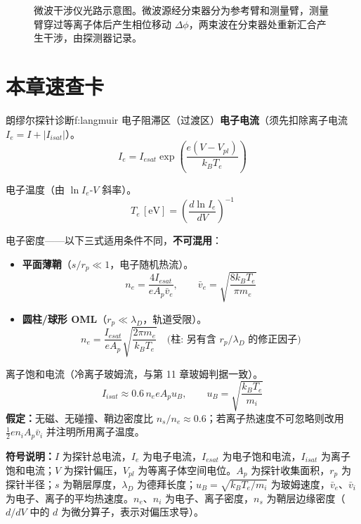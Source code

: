 \begin{figure}[htbp]
    \caption{微波干涉仪光路示意图。微波源经分束器分为参考臂和测量臂，测量臂穿过等离子体后产生相位移动 $\Delta\phi$，两束波在分束器处重新汇合产生干涉，由探测器记录。}
    \label{fig:interferometer}
\end{figure}


\section{本章速查卡}

\begin{formulabox}{朗缪尔探针诊断}{f:langmuir}
电子阻滞区（过渡区）\textbf{电子电流}（须先扣除离子电流 $I_e = I + |I_{isat}|$）。
\[
    I_e = I_{esat} \exp\left(\frac{e(V - V_{pl})}{k_B T_e}\right)
\]

电子温度（由 $\ln I_e$-$V$ 斜率）。
\[
    T_e\,[\mathrm{eV}] = \left(\frac{d\ln I_e}{dV}\right)^{-1}
\]

电子密度——以下三式适用条件不同，\textbf{不可混用}：
\begin{itemize}
    \item \textbf{平面薄鞘}（$s/r_p\ll1$，电子随机热流）。
    \[
        n_e = \frac{4 I_{esat}}{e A_p \bar v_e},\qquad \bar v_e = \sqrt{\frac{8k_BT_e}{\pi m_e}}
    \]
    \item \textbf{圆柱/球形 OML}（$r_p\ll\lambda_D$，轨道受限）。
    \[
        n_e = \frac{I_{esat}}{e A_p}\sqrt{\frac{2\pi m_e}{k_B T_e}}
        \quad\text{(柱: 另有含 } r_p/\lambda_D \text{ 的修正因子)}
    \]
\end{itemize}

离子饱和电流（冷离子玻姆流，与第 11 章玻姆判据一致）。
\[
    I_{isat} \approx 0.6\, n_e e A_p u_B,\qquad u_B = \sqrt{\frac{k_B T_e}{m_i}}
\]
\textbf{假定：}无磁、无碰撞、鞘边密度比 $n_s/n_e \approx 0.6$；若离子热速度不可忽略则改用 $\frac12 en_iA_p\bar v_i$ 并注明所用离子温度。

\textbf{符号说明：}$I$ 为探针总电流，$I_e$ 为电子电流，$I_{esat}$ 为电子饱和电流，$I_{isat}$ 为离子饱和电流；$V$ 为探针偏压，$V_{pl}$ 为等离子体空间电位。$A_p$ 为探针收集面积，$r_p$ 为探针半径；$s$ 为鞘层厚度，$\lambda_D$ 为德拜长度；$u_B=\sqrt{k_BT_e/m_i}$ 为玻姆速度，$\bar v_e$、$\bar v_i$ 为电子、离子的平均热速度。$n_e$、$n_i$ 为电子、离子密度，$n_s$ 为鞘层边缘密度（$d/dV$ 中的 $d$ 为微分算子，表示对偏压求导）。
\end{formulabox}

